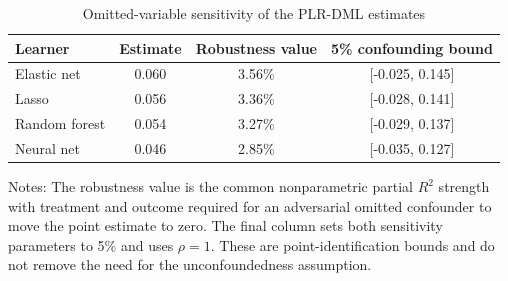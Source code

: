 \begin{table}[!htbp]
\centering
\caption{Omitted-variable sensitivity of the PLR-DML estimates}
\label{tab:robustness_plr_sensitivity}
\small
\setlength{\tabcolsep}{7pt}
\begin{tabular}{lccc}
\hline
Learner & Estimate & Robustness value & 5\% confounding bound
\\
\hline
Elastic net & 0.060 & 3.56\% & [-0.025, 0.145]
\\
Lasso & 0.056 & 3.36\% & [-0.028, 0.141]
\\
Random forest & 0.054 & 3.27\% & [-0.029, 0.137]
\\
Neural net & 0.046 & 2.85\% & [-0.035, 0.127]
\\
\hline
\end{tabular}
\begin{minipage}{0.96\textwidth}
\footnotesize Notes: The robustness value is the common nonparametric partial $R^2$ strength with treatment and outcome required for an adversarial omitted confounder to move the point estimate to zero. The final column sets both sensitivity parameters to 5\% and uses $\rho=1$. These are point-identification bounds and do not remove the need for the unconfoundedness assumption.
\end{minipage}
\end{table}

